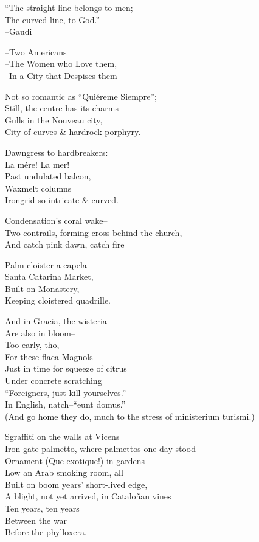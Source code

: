 ``The straight line belongs to men; \\
The curved line, to God.'' \\
\hfill --Gaudi

--Two Americans \\
--The Women who Love them, \\
--In a City that Despises them

Not so romantic as ``Quiéreme Siempre''; \\
Still, the centre has its charms-- \\
Gulls in the  Nouveau city, \\
City of curves \& hardrock porphyry.

Dawngress to hardbreakers: \\
La mére! La mer! \\
Past undulated balcon, \\
Waxmelt columns \\
Irongrid so intricate \& curved.

Condensation's coral wake-- \\
Two contrails, forming cross behind the church, \\
And catch pink dawn, catch fire

Palm cloister a capela \\
Santa Catarina Market, \\
Built on Monastery, \\
Keeping cloistered quadrille.

And in Gracia, the wisteria \\
Are also in bloom-- \\
Too early, tho, \\
For these flaca Magnols \\
Just in time for squeeze of citrus \\
Under concrete scratching \\
``Foreigners, just kill yourselves.'' \\
In English, natch--``eunt domus.'' \\
(And go home they do, much to the stress of ministerium turismi.)

Sgraffiti on the walls at Vicens \\
Iron gate palmetto, where palmettos one day stood \\
Ornament (Que exotique!) in gardens \\
Low an Arab smoking room, all \\
Built on boom years' short-lived edge, \\
A blight, not yet arrived, in Cataloñan vines \\
Ten years, ten years \\
Between the war \\
Before the phylloxera.